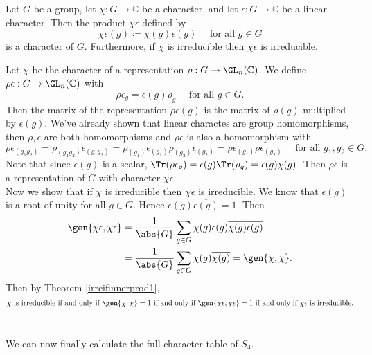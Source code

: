 \documentclass[../Project.tex]{subfiles}
\begin{document}
\begin{prop}[{\cite[Proposition 17.14]{2}}]
	\label{linprodischar}
	Let $G$ be a group, let $\chi : G \to \mathbb{C}$ be a character, and let $\epsilon : G \to \mathbb{C}$ be a linear character. Then the product $\chi\epsilon$ defined by
	$$\chi\epsilon(g) \coloneqq \chi(g)\epsilon(g)\quad \text{ for all } g \in G$$
	is a character of $G$.
	Furthermore, if $\chi$ is irreducible then $\chi\epsilon$ is irreducible.
\end{prop}
\begin{proo*}[{\cite[Proposition 17.14]{2}}]
	Let $\chi$ be the character of a representation $\rho : G \to \GL_n(\mathbb{C})$. We define $\rho\epsilon : G \to \GL_n(\mathbb{C})$ with
	$$\rho\epsilon_{g} = \epsilon(g)\rho_g\quad \text{ for all } g \in G.$$
	Then the matrix of the representation $\rho\epsilon(g)$ is the matrix of $\rho(g)$ multiplied by $\epsilon(g)$. We've already shown that linear charactes are group homomorphisms, then $\rho,\epsilon$ are both homomorphisms and $\rho\epsilon$ is also a homomorphism with 
	$$\rho\epsilon_{(g_1g_2)} = \rho_{(g_1g_2)}\epsilon_{(g_1g_2)} = \rho_{(g_1)}\epsilon_{(g_1)}\rho_{(g_2)}\epsilon_{(g_2)} = \rho\epsilon_{(g_1)}\rho\epsilon_{(g_2)} \quad \text{ for all } g_1,g_2 \in G.$$
	Note that since $\epsilon(g)$ is a scalar, $\Tr(\rho\epsilon_g) = \epsilon(g)\Tr(\rho_g) = \epsilon(g)\chi(g)$. Then $\rho\epsilon$ is a representation of $G$ with character $\chi\epsilon$.\\

	Now we show that if $\chi$ is irreducible then $\chi\epsilon$ is irreducible. We know that $\epsilon(g)$ is a root of unity for all $g \in G$. Hence $\epsilon(g)\overline{\epsilon(g)} = 1$. Then
	\begin{align*}
		\gen{\chi\epsilon,\chi\epsilon} &= \frac{1}{\abs{G}}\sum_{g \in G}\chi(g)\epsilon(g)\overline{\chi(g)\epsilon(g)}\\
		&= \frac{1}{\abs{G}}\sum_{g \in G}\chi(g)\overline{\chi(g)} = \gen{\chi,\chi}.
	\end{align*}
	Then by Theorem \ref{irreifinnerprod1},
	$$\chi \text{ is irreducible} \text{ if and only if } \gen{\chi,\chi} = 1 \text{ if and only if } \gen{\chi\epsilon,\chi\epsilon} = 1 \text{ if and only if } \chi\epsilon \text{ is irreducible}.$$\\
\end{proo*}

We can now finally calculate the full character table of $S_4$.
\end{document}

